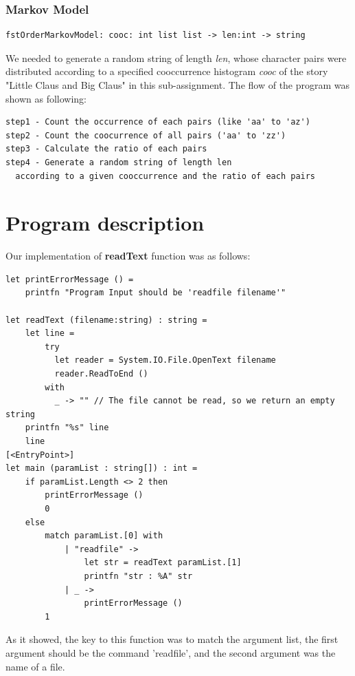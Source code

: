\documentclass{article}
\begin{document}
\subsubsection{Markov Model}
\begin{lstlisting}
fstOrderMarkovModel: cooc: int list list -> len:int -> string
\end{lstlisting}

We needed to generate a random string of length \emph{len}, whose character pairs were distributed according to a specified cooccurrence histogram \emph{cooc} of the story "Little Claus and Big Claus" in this sub-assignment. The flow of the program was shown as following:

\begin{lstlisting}
step1 - Count the occurrence of each pairs (like 'aa' to 'az')
step2 - Count the coocurrence of all pairs ('aa' to 'zz')
step3 - Calculate the ratio of each pairs
step4 - Generate a random string of length len
  according to a given cooccurrence and the ratio of each pairs
\end{lstlisting}


\section{Program description}

Our implementation of \textbf{readText} function was as follows:

\begin{lstlisting}
let printErrorMessage () =
    printfn "Program Input should be 'readfile filename'"

let readText (filename:string) : string = 
    let line = 
        try
          let reader = System.IO.File.OpenText filename
          reader.ReadToEnd ()
        with
          _ -> "" // The file cannot be read, so we return an empty string
    printfn "%s" line
    line
[<EntryPoint>]
let main (paramList : string[]) : int = 
    if paramList.Length <> 2 then
        printErrorMessage ()
        0
    else
        match paramList.[0] with
            | "readfile" ->
                let str = readText paramList.[1]
                printfn "str : %A" str
            | _ ->
                printErrorMessage ()
        1    
\end{lstlisting}

As it showed, the key to this function was to match the argument list, the first argument should be the command 'readfile', and the second argument was the name of a  file.
\end{document}

